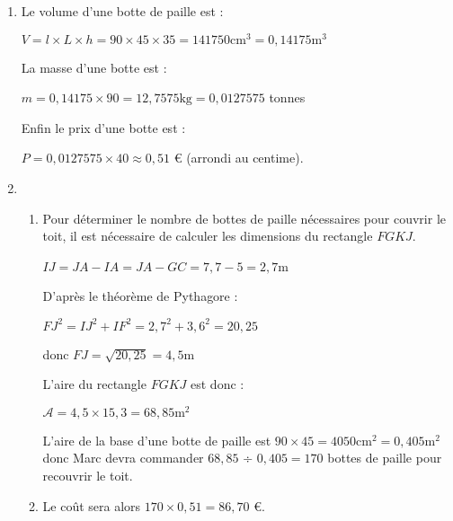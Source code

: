 \begin{corrige}
     \begin{enumerate}
          \item
          Le volume d'une botte de paille est :
          \par
          $V = l\times L\times h = 90\times 45\times 35 = 141 750 \text{cm}^{3} = 0,14175 \text{m}^{3}$
          \par
          La masse d'une botte est :
          \par
          $m = 0,14175\times 90 = 12,7575 \text{kg} = 0,0127575$ tonnes
          \par
          Enfin le prix d'une botte est :
          \par
          $P = 0,0127575\times 40 \approx  0,51$ € (arrondi au centime).
          \item
          \begin{enumerate}[label=\alph*.]
               \item
               Pour déterminer le nombre de bottes de paille nécessaires pour couvrir le toit, il est nécessaire de calculer les dimensions du rectangle $FGKJ$.
               \par
               $IJ=JA-IA=JA-GC=7,7-5=2,7$m
               \par
               D'après le théorème de Pythagore :
               \par
               $FJ^{2} = IJ^{2}+IF^{2} = 2,7^{2}+3,6^{2} = 20,25$
               \par
               donc $FJ = \sqrt{20,25} = 4,5$m
               \par
               L'aire du rectangle $FGKJ$ est donc :
               \par
               $\mathscr A = 4,5\times 15,3 = 68,85 \text{m}^{2}$
               \par
               L'aire de la base d'une botte de paille est $90\times 45 = 4050 \text{cm}^{2} = 0,405 \text{m}^{2}$ donc Marc devra commander $68,85$ ÷ $0,405 =170$ bottes de paille pour recouvrir le toit.
               \item
               Le coût sera alors $170\times 0,51 = 86,70$ €.
          \end{enumerate}
     \end{enumerate}
\end{corrige}
